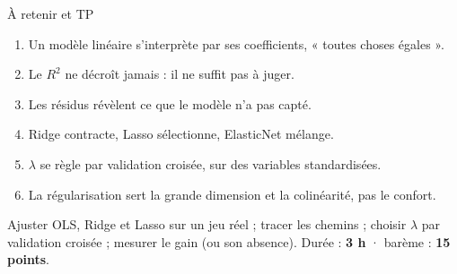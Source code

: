 \begin{frame}{À retenir et TP}
\begin{kbox}
\begin{enumerate}
  \item Un modèle linéaire s'interprète par ses coefficients, « toutes choses
        égales ».
  \item Le $R^2$ ne décroît jamais : il ne suffit pas à juger.
  \item Les résidus révèlent ce que le modèle n'a pas capté.
  \item Ridge contracte, Lasso sélectionne, ElasticNet mélange.
  \item $\lambda$ se règle par validation croisée, sur des variables standardisées.
  \item La régularisation sert la grande dimension et la colinéarité, pas le confort.
\end{enumerate}
\end{kbox}
\vspace{1.5mm}
\begin{abox}
Ajuster OLS, Ridge et Lasso sur un jeu réel ; tracer les chemins ; choisir
$\lambda$ par validation croisée ; mesurer le gain (ou son absence).
Durée : \textbf{3 h} · barème : \textbf{15 points}.
\end{abox}
\end{frame}
